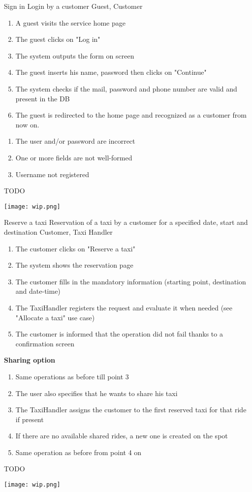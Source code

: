 \usecase
{Sign in}
{Login by a customer}
{Guest, Customer}
{
\begin{enumerate}
	\item A guest visits the service home page
	\item The guest clicks on "Log in"
	\item The system outputs the form on screen
	\item The guest inserts his name, password then clicks on "Continue"
	\item The system checks if the mail, password and phone number are valid and present in the DB
	\item The guest is redirected to the home page and recognized as a customer from now on.
\end{enumerate}
}
{
\begin{enumerate}
	\item The user and/or password are incorrect
	\item One or more fields are not well-formed
	\item Username not registered
\end{enumerate}
}
{ TODO }

\pagebreak
\texttt{[image: wip.png]}

\usecase
{Reserve a taxi}
{Reservation of a taxi by a customer for a specified date, start and destination}
{Customer, Taxi Handler}
{
\begin{enumerate}
	\item The customer clicks on "Reserve a taxi"
	\item The system shows the reservation page
	\item The customer fills in the mandatory information (starting point, destination and date-time)
	\item The TaxiHandler registers the request and evaluate it when needed (see "Allocate a taxi" use case)
	\item The customer is informed that the operation did not fail thanks to a confirmation screen
\end{enumerate}
}
{
\textbf{Sharing option}
\begin{enumerate}
	\item Same operations as before till point 3
	\item The user also specifies that he wants to share his taxi
	\item The TaxiHandler assigns the customer to the first reserved taxi for that ride if present
	\item If there are no available shared rides, a new one is created on the spot
	\item Same operation as before from point 4 on
\end{enumerate}
}
{ TODO }

\pagebreak
\texttt{[image: wip.png]}
